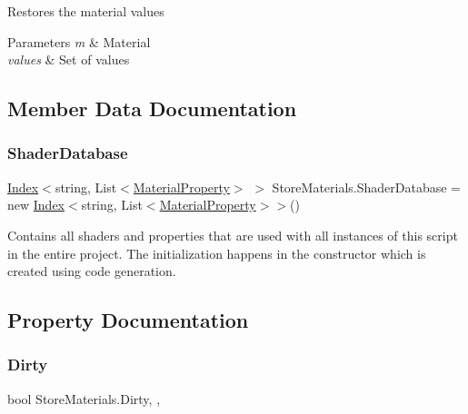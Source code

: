 Restores the material values 


\begin{DoxyParams}{Parameters}
{\em m} & Material\\
\hline
{\em values} & Set of values\\
\hline
\end{DoxyParams}


\subsection{Member Data Documentation}
\mbox{\label{class_store_materials_aeb8daf834861b7a2438a6e922588b7cb}} 
\subsubsection{\texorpdfstring{Shader\+Database}{ShaderDatabase}}
{\footnotesize\ttfamily \hyperlink{class_index}{Index}$<$string, List$<$\hyperlink{class_store_materials_1_1_material_property}{Material\+Property}$>$ $>$ Store\+Materials.\+Shader\+Database = new \hyperlink{class_index}{Index}$<$string, List$<$\hyperlink{class_store_materials_1_1_material_property}{Material\+Property}$>$$>$()\hspace{0.3cm}{\ttfamily [static]}}



Contains all shaders and properties that are used with all instances of this script in the entire project. The initialization happens in the constructor which is created using code generation. 



\subsection{Property Documentation}
\mbox{\label{class_store_materials_abc3745cd424bdab53c1a656a1696556b}} 
\subsubsection{\texorpdfstring{Dirty}{Dirty}}
{\footnotesize\ttfamily bool Store\+Materials.\+Dirty\hspace{0.3cm}{\ttfamily [static]}, {\ttfamily [get]}, {\ttfamily [set]}}



